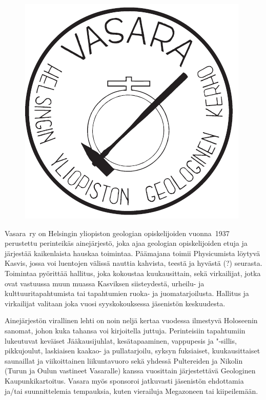 \documentclass[a5paper, 8pt, twocolumn]{book} %
\numberwithin{equation}{section}
\begin{document}
\begin{figure}[!b]
	\includegraphics[width=\columnwidth]{vasara.png}
\end{figure}
Vasara~ry on Helsingin yliopiston geologian
opiskelijoiden vuonna~1937 perustettu
perinteikäs ainejärjestö, joka ajaa geologian
opiskelijoiden etuja ja järjestää kaikenlaista
hauskaa toimintaa. Päämajana toimii
Physicumista löytyvä Kasvis, jossa
voi luentojen välissä nauttia kahvista, teestä
ja hyvästä (?) seurasta. Toimintaa pyörittää
hallitus, joka kokoustaa kuukausittain,
sekä virkailijat, jotka ovat vastuussa muun
muassa Kasviksen siisteydestä, urheilu- ja
kulttuuritapahtumista tai tapahtumien ruoka-
ja juomatarjoilusta. Hallitus ja virkailijat
valitaan joka vuosi syyskokouksessa
jäsenistön keskuudesta.

Ainejärjestön virallinen lehti on noin
neljä kertaa vuodessa ilmestyvä Holo\-seenin
sanomat, johon kuka tahansa voi kirjoitella
juttuja. Perinteisiin tapahtumiin lukeutuvat
keväiset Jää\-kausi\-juhlat, kesä\-tapaaminen,
vappu\-pesis ja "-sillis, pikku\-joulut, laskiaisen
kaakao- ja pulla\-tarjoilu, syksyn fuksiaiset,
kuukausittaiset sauna\-illat ja viikoittainen
liikunta\-vuoro sekä yhdessä Pultereiden ja
Nikolin (Turun ja Oulun vastineet Vasaralle)
kanssa vuosittain järjestettävä Geologinen
Kaupunki\-kartoitus. Vasara myös sponsoroi
jatkuvasti jäsenistön ehdottamia ja/tai
suunnittelemia tempauksia, kuten vierailuja
Mega\-zoneen tai kiipeilemään.
\end{document}
